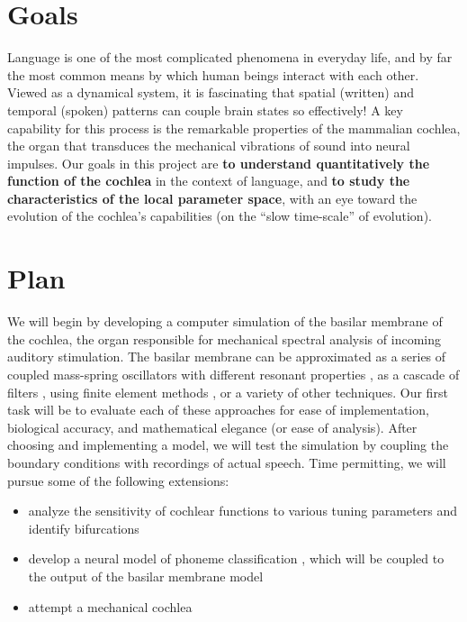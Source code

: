 

\section{Goals}

Language is one of the most complicated phenomena in everyday life, and by far
the most common means by which human beings interact with each other. Viewed as
a dynamical system, it is fascinating that spatial (written) and temporal
(spoken) patterns can couple brain states so effectively! A key capability for
this process is the remarkable properties of the mammalian cochlea, the organ
that transduces the mechanical vibrations of sound into neural impulses. Our
goals in this project are \textbf{to understand quantitatively the function of
the cochlea} in the context of language, and \textbf{to study the
characteristics of the local parameter space}, with an eye toward the evolution
of the cochlea's capabilities (on the ``slow time-scale'' of evolution\cite{manley72}).

\section{Plan}

We will begin by developing a computer simulation of the basilar membrane of
the cochlea, the organ responsible for mechanical spectral analysis of incoming
auditory stimulation\cite{nilsen99,ruggero97}. The basilar membrane can be
approximated as a series of coupled mass-spring oscillators with different
resonant properties \cite{hubbard06,hubbard96}, as a cascade of filters
\cite{linggard89}, using finite element methods \cite{skrodzka05}, or a variety
of other techniques. Our first task will be to evaluate each of these
approaches for ease of implementation, biological accuracy, and mathematical
elegance (or ease of analysis). After choosing and implementing a model, we
will test the simulation by coupling the boundary conditions with recordings of
actual speech. Time permitting, we will pursue some of the following
extensions:

\begin{itemize}
	\item analyze the sensitivity of cochlear functions to various tuning parameters \cite{yates90} and identify bifurcations
	\item develop a neural model of phoneme classification \cite{mesgarani08}, which will be coupled to the output of the
basilar membrane model
	\item attempt a mechanical cochlea \cite{hubbard06,keolian97}
\end{itemize}






